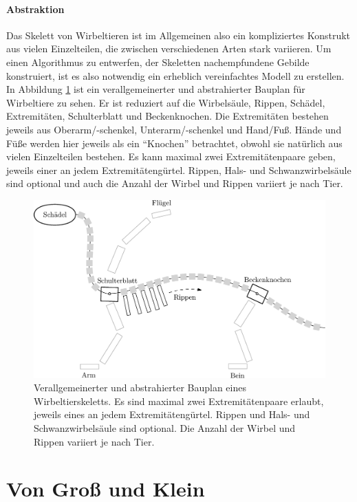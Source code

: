 \paragraph{Abstraktion}
Das Skelett von Wirbeltieren ist im Allgemeinen also ein kompliziertes Konstrukt aus vielen Einzelteilen, die zwischen verschiedenen Arten stark variieren. Um einen Algorithmus zu entwerfen, der Skeletten nachempfundene Gebilde konstruiert, ist es also notwendig ein erheblich vereinfachtes Modell zu erstellen.\\ 
In Abbildung \ref{bauplan_skelett} ist ein verallgemeinerter und abstrahierter Bauplan für Wirbeltiere zu sehen. Er ist reduziert auf die Wirbelsäule, Rippen, Schädel, Extremitäten, Schulterblatt und Beckenknochen. Die Extremitäten bestehen jeweils aus Oberarm/-schenkel, Unterarm/-schenkel und Hand/Fuß. Hände und Füße werden hier jeweils als ein "`Knochen"' betrachtet, obwohl sie natürlich aus vielen Einzelteilen bestehen. Es kann maximal zwei Extremitätenpaare geben, jeweils einer an jedem Extremitätengürtel. Rippen, Hals- und Schwanzwirbelsäule sind optional und auch die Anzahl der Wirbel und Rippen variiert je nach Tier.

\begin{figure}
 \centering
 \includegraphics[width=\textwidth]{graphics/skeletonPlan}
 \caption{Verallgemeinerter und abstrahierter Bauplan eines Wirbeltierskeletts. Es sind maximal zwei Extremitätenpaare erlaubt, jeweils eines an jedem Extremitätengürtel. Rippen und Hals- und Schwanzwirbelsäule sind optional. Die Anzahl der Wirbel und Rippen variiert je nach Tier.}
 \label{bauplan_skelett}
\end{figure}


\section{Von Groß und Klein}
\label{bigAndSmall}

